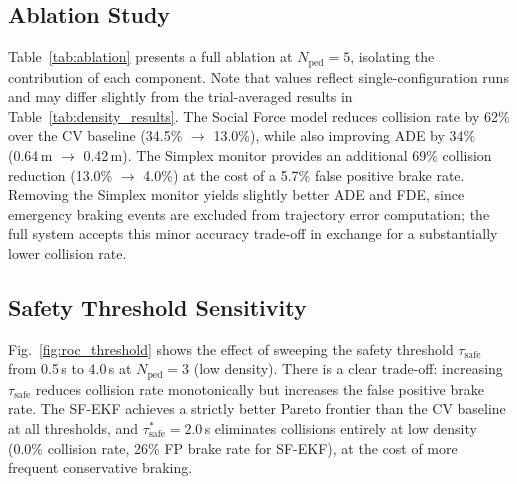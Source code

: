 \documentclass[conference]{IEEEtran}
\begin{document}
\subsection{Ablation Study}

Table~\ref{tab:ablation} presents a full ablation at $N_{\text{ped}} = 5$, isolating the contribution of each component. Note that values reflect single-configuration runs and may differ slightly from the trial-averaged results in Table~\ref{tab:density_results}. The Social Force model reduces collision rate by 62\% over the CV baseline (34.5\% $\to$ 13.0\%), while also improving ADE by 34\% (0.64\,m $\to$ 0.42\,m). The Simplex monitor provides an additional 69\% collision reduction (13.0\% $\to$ 4.0\%) at the cost of a 5.7\% false positive brake rate. Removing the Simplex monitor yields slightly better ADE and FDE, since emergency braking events are excluded from trajectory error computation; the full system accepts this minor accuracy trade-off in exchange for a substantially lower collision rate.

\begin{table}[H]
\centering
\caption{Ablation study at $N_{\text{ped}} = 5$, $\tau_{\text{safe}} = 2.0$\,s. Each row removes one component from the full system. Values reflect single-configuration runs. FP Brake = false positive emergency brake rate.}
\label{tab:ablation}

\end{table}

\subsection{Safety Threshold Sensitivity}

Fig.~\ref{fig:roc_threshold} shows the effect of sweeping the safety threshold $\tau_{\text{safe}}$ from 0.5\,s to 4.0\,s at $N_{\text{ped}} = 3$ (low density).
There is a clear trade-off: increasing $\tau_{\text{safe}}$ reduces collision rate monotonically but increases the false positive brake rate.
The SF-EKF achieves a strictly better Pareto frontier than the CV baseline at all thresholds, and $\tau_{\text{safe}}^* = 2.0$\,s eliminates collisions entirely at low density (0.0\% collision rate, 26\% FP brake rate for SF-EKF), at the cost of more frequent conservative braking.
\end{document}
